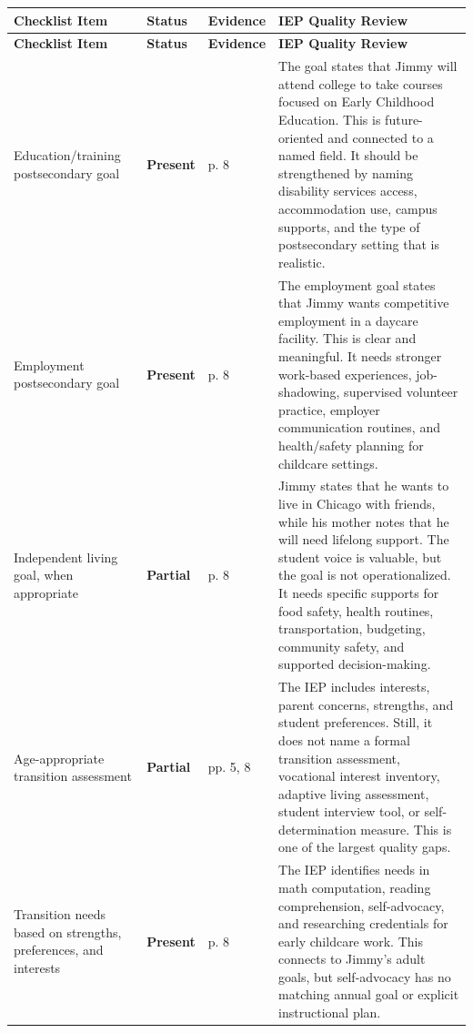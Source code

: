\documentclass[11pt]{article}
\newcommand{\Present}{\textbf{\textcolor{PresentGreen}{Present}}}
\newcommand{\Partial}{\textbf{\textcolor{PartialOrange}{Partial}}}
\begin{document}
\footnotesize
{}
\begin{longtable}{L{0.16\textwidth} L{0.055\textwidth} L{0.07\textwidth} L{0.63\textwidth}}
\toprule
\textbf{Checklist Item} & \textbf{Status} & \textbf{Evidence} & \textbf{IEP Quality Review} \\
\midrule
\endfirsthead
\toprule
\textbf{Checklist Item} & \textbf{Status} & \textbf{Evidence} & \textbf{IEP Quality Review} \\
\midrule
\endhead
Education/training postsecondary goal & \Present & p. 8 & The goal states that Jimmy will attend college to take courses focused on Early Childhood Education. This is future-oriented and connected to a named field. It should be strengthened by naming disability services access, accommodation use, campus supports, and the type of postsecondary setting that is realistic. \\

Employment postsecondary goal & \Present & p. 8 & The employment goal states that Jimmy wants competitive employment in a daycare facility. This is clear and meaningful. It needs stronger work-based experiences, job-shadowing, supervised volunteer practice, employer communication routines, and health/safety planning for childcare settings. \\

Independent living goal, when appropriate & \Partial & p. 8 & Jimmy states that he wants to live in Chicago with friends, while his mother notes that he will need lifelong support. The student voice is valuable, but the goal is not operationalized. It needs specific supports for food safety, health routines, transportation, budgeting, community safety, and supported decision-making. \\

Age-appropriate transition assessment & \Partial & pp. 5, 8 & The IEP includes interests, parent concerns, strengths, and student preferences. Still, it does not name a formal transition assessment, vocational interest inventory, adaptive living assessment, student interview tool, or self-determination measure. This is one of the largest quality gaps. \\

Transition needs based on strengths, preferences, and interests & \Present & p. 8 & The IEP identifies needs in math computation, reading comprehension, self-advocacy, and researching credentials for early childcare work. This connects to Jimmy's adult goals, but self-advocacy has no matching annual goal or explicit instructional plan. \\


\end{longtable}
\end{document}
